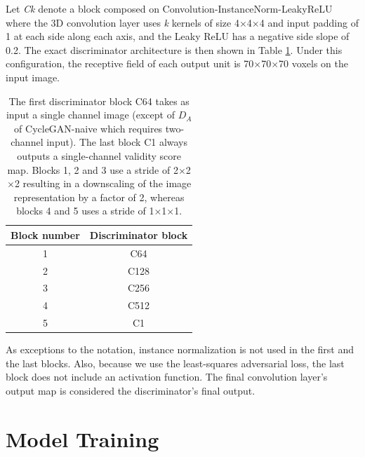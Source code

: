 Let \textit{Ck} denote a block composed on Convolution-InstanceNorm-LeakyReLU where the 3D convolution layer uses \textit{k} kernels of size 4$\times$4$\times$4 and input padding of 1 at each side along each axis, and the Leaky ReLU has a negative side slope of 0.2. The exact discriminator architecture is then shown in Table \ref{tab:discriminator_architecture}. Under this configuration, the receptive field of each output unit is 70$\times$70$\times$70 voxels on the input image.

\begin{table}[h!]
    \centering
    \begin{tabular}{|c|c|}
        \hline
        \textbf{Block number} & \textbf{Discriminator block}\\
        \hline
        1     & C64       \\
        \hline
        2     & C128      \\
        \hline
        3     & C256      \\
        \hline 
        4     & C512      \\
        \hline
        5     & C1        \\
        \hline
    \end{tabular}
    \caption{The first discriminator block C64 takes as input a single channel image (except of $D_A$ of CycleGAN-naive which requires two-channel input). The last block C1 always outputs a single-channel validity score map. Blocks 1, 2 and 3 use a stride of 2$\times$2$\times$2 resulting in a downscaling of the image representation by a factor of 2, whereas blocks 4 and 5 uses a stride of 1$\times$1$\times$1.}
    \label{tab:discriminator_architecture}
\end{table}
As exceptions to the notation, instance normalization is not used in the first and the last blocks. Also, because we use the least-squares adversarial loss, the last block does not include an activation function. The final convolution layer's output map is considered the discriminator's final output.



\section{Model Training}


